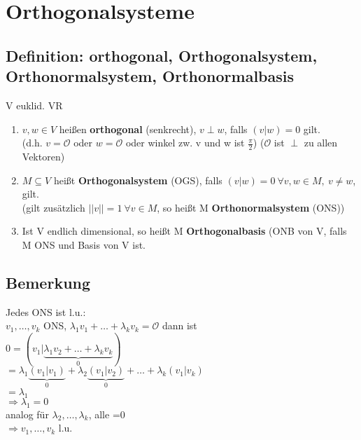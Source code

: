  


\section{Orthogonalsysteme}

\subsection{Definition: orthogonal, Orthogonalsystem, Orthonormalsystem, Orthonormalbasis}
V euklid. VR
\begin{enumerate}
\item
$v,w \in V$ heißen \textbf{orthogonal} (senkrecht), $v \perp w$, falls $(v|w)=0$ gilt.\\
(d.h. $v=\mathcal{O}$ oder $w=\mathcal{O}$ oder winkel zw. v und w ist $\frac{\pi}{2}$) ($\mathcal{O}$ ist $\perp$ zu allen Vektoren)

\item
$M\subseteq V$ heißt \textbf{Orthogonalsystem} (OGS), falls $(v|w)=0 \ \forall v,w \in M, \ v\neq w$, gilt.\\
(gilt zusätzlich $||v||=1 \ \forall v\in M$, so heißt M \textbf{Orthonormalsystem} (ONS))

\item
Ist V endlich dimensional, so heißt M \textbf{Orthogonalbasis} (ONB von V, falls M ONS und Basis von V ist.
\end{enumerate}

\subsection{Bemerkung}
Jedes ONS ist l.u.:\\
$v_1,\dots,v_k$ ONS, $\lambda_1v_1+\dots+\lambda_kv_k=\mathcal{O}$
dann ist\\
$0 = (v_1|\underbrace{\lambda_1v_2+\dots+\lambda_kv_k}_0) $\\
$= \lambda_1\underbrace{(v_1|v_1)}_0 + \lambda_2\underbrace{(v_1|v_2)}_0+\dots+\lambda_k(v_1|v_k)$\\
$ = \lambda_1$\\
$\Rightarrow \lambda_1=0$\\
analog für $\lambda_2,\dots,\lambda_k$, alle =0\\
$\Rightarrow v_1,\dots,v_k$ l.u.

